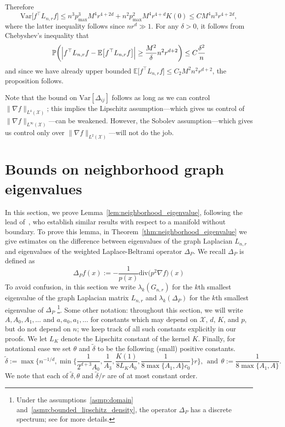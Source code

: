\documentclass[twoside]{article}
\newcommand{\Var}{\mathrm{Var}}
\newcommand{\1}{\mathbf{1}}
\newcommand{\Lap}{L}
\newcommand{\Xset}{\mathcal{X}}
\newcommand{\Leb}{L}
\newcommand{\Pbb}{\mathbb{P}}
\newcommand{\Ebb}{\mathbb{E}}
\newcommand{\dive}{\mathrm{div}}
\newcommand{\wt}[1]{\widetilde{#1}}
\theoremstyle{definition}
\theoremstyle{remark}
\begin{document}
Therefore
\begin{equation*}
\Var\bigl[f^{\top} \Lap_{n,r} f\bigr] \leq n^3 p_{\max}^3 M^4 r^{4 + 2d} + n^2 p_{\max}^2 M^4 r^{4 + d} K(0) \leq C M^4 n^3r^{4 + 2d},
\end{equation*}
where the latter inequality follows since $nr^d \gg 1$. For any $\delta > 0$, it follows from Chebyshev's inequality that
\begin{equation*}
\Pbb\biggl(\Bigl|f^{\top} \Lap_{n,r} f - \Ebb\bigl[f^{\top} \Lap_{n,r} f\bigr]\Bigr| \geq \frac{M^2}{\delta}n^2 r^{d + 2}\biggr) \leq C\frac{\delta^2}{n}
\end{equation*}
and since we have already upper bounded $\Ebb\bigl[f^{\top} \Lap_{n,r} f\bigr] \leq C_2 M^2 n^2 r^{d + 2}$, the proposition follows. 

Note that the bound on $\Var[\varDelta_{i j}]$ follows as long as we can control $\|\nabla f\|_{\Leb^4(\Xset)}$; this implies the Lipschitz assumption---which gives us control of $\|\nabla f\|_{\Leb^{\infty}(\Xset)}$---can be weakened. However, the Sobolev assumption---which gives us control only over $\|\nabla f\|_{\Leb^2(\Xset)}$---will not do the job. 
\section{Bounds on neighborhood graph eigenvalues}
\label{sec:graph_eigenvalues}
In this section, we prove Lemma~\ref{lem:neighborhood_eigenvalue}, following the lead of~\citet{burago2014,trillos2019,calder2019}, who establish similar results with respect to a manifold without boundary. To prove this lemma, in  Theorem~\ref{thm:neighborhood_eigenvalue} we give estimates on the difference between eigenvalues of the graph Laplacian $L_{n,r}$ and eigenvalues of the weighted Laplace-Beltrami operator $\Delta_P$. We recall $\Delta_P$ is defined as
\begin{equation*}
\Delta_Pf(x) := -\frac{1}{p(x)} \dive\bigl(p^2\nabla f\bigr)(x)
\end{equation*}
To avoid confusion, in this section we write $\lambda_k(G_{n,r})$ for the $k$th smallest eigenvalue of the graph Laplacian matrix $\Lap_{n,r}$ and $\lambda_k(\Delta_P)$ for the $k$th smallest eigenvalue of $\Delta_P$ \footnote{Under the assumptions~\ref{asmp:domain} and~\ref{asmp:bounded_lipschitz_density}, the operator $\Delta_P$ has a discrete spectrum; see \citet{garciatrillos18} for more details.}. Some other notation: throughout this section, we will write $A, A_0, A_1,\ldots$ and $a,a_0,a_1,\ldots$ for constants which may depend on $\Xset$, $d$, $K$, and $p$, but do not depend on $n$; we keep track of all such constants explicitly in our proofs. We let $L_K$ denote the Lipschitz constant of the kernel $K$. Finally, for notational ease we set $\theta$ and $\wt{\delta}$ to be the following (small) positive constants.
\begin{equation}
\label{asmp:smallness}
\wt{\delta} := \max\Biggl\{n^{-1/d}, \min\biggl\{\frac{1}{2^{d + 3}A_0}, \frac{1}{A_3}, \frac{K(1)}{8L_KA_0}, \frac{1}{8\max\{A_1,A\}c_0}\biggr\}r\Biggr\},~~\textrm{and}~~
\theta := \frac{1}{8\max\{A_1,A\}}.
\end{equation} 
We note that each of $\wt{\delta}, \theta$ and $\wt{\delta}/r$ are of at most constant order. 
\end{document}
